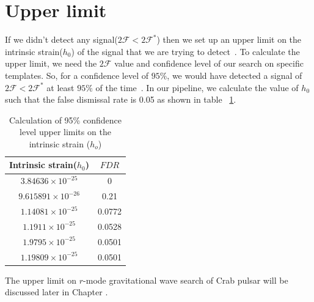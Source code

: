 \documentclass{ttuthes2007}
\begin{document}
\section{Upper limit}
If we didn't detect any signal($2\mathcal{F}<2\mathcal{F}^*$) then we set up an
upper limit on the intrinsic strain($h_0$) of the signal that we are trying to
detect~\cite{Romano_2017}. To calculate the upper limit, we need the
$2\mathcal{F}$ value and confidence level of our search on specific templates. 
So, for a confidence level of $95\%$, we would have detected a signal of
$2\mathcal{F}<2\mathcal{F}^*$ at least $95\%$ of the time~\cite{Romano_2017}. In
our pipeline, we calculate the value of $h_0$ such that the false dismissal rate
is 0.05 as shown in table ~\ref{table:UL}.
\begin{table}                                                                  
\begin{center}                                                                  
\begin{tabular}{|c|c|}                                                           
\hline
\textrm{Intrinsic strain($h_0$)} & \textrm{$FDR$} \\                         
\hline
$3.84636\times10^{-25}$ & 0\\
$9.615891\times10^{-26}$ & 0.21 \\
$1.14081\times10^{-25}$ & 0.0772\\
$1.1911\times10^{-25}$ & 0.0528\\
$1.9795\times10^{-25}$ & 0.0501\\
$1.19809\times10^{-25}$ & 0.0501\\
\hline
\end{tabular}                                                                   
\end{center}                                                                    
\caption{Calculation of 95\% confidence level upper limits on the intrinsic strain ($h_o$)}                                                  
\label{table:UL}                                                        
\end{table}                   
The upper limit on $r$-mode gravitational wave search of Crab pulsar will be
discussed later in Chapter .
\end{document}
